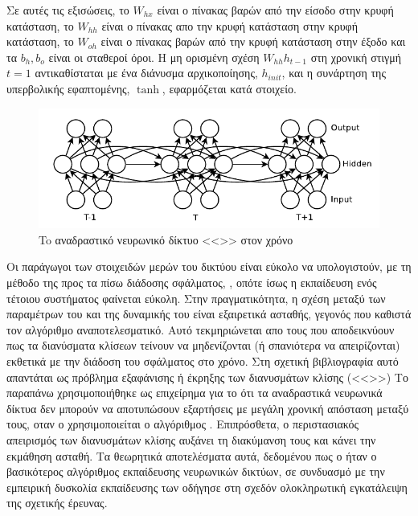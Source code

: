 Σε αυτές τις εξισώσεις, το $W_{hx}$ είναι ο πίνακας βαρών από την είσοδο στην κρυφή κατάσταση, το $W_{hh}$ είναι ο πίνακας απο την κρυφή κατάσταση στην κρυφή κατάσταση, το $W_{oh}$ είναι ο πίνακας βαρών από την κρυφή κατάσταση στην έξοδο και τα $b_h, b_o$ είναι οι σταθεροί όροι.
Η μη ορισμένη σχέση $W_{hh}h_{t-1}$ στη χρονική στιγμή $t = 1$ αντικαθίσταται με ένα διάνυσμα αρχικοποίησης, $h_{init}$, και η συνάρτηση της υπερβολικής εφαπτομένης, $\tanh$, εφαρμόζεται κατά στοιχείο.

\begin{figure}[tph]
	\includegraphics[width=\textwidth, keepaspectratio]{images/rnn.png}
	\centering 
	\caption{To αναδραστικό νευρωνικό δίκτυο <<>> στον χρόνο}
	\label{fig:rnn}
\end{figure}

Οι παράγωγοι των στοιχειδών μερών του δικτύου είναι εύκολο να υπολογιστούν, με τη μέθοδο της προς τα πίσω διάδοσης σφάλματος, \cite{Graves2013}, οπότε ίσως η εκπαίδευση ενός τέτοιου συστήματος φαίνεται εύκολη.
Στην πραγματικότητα, η σχέση μεταξύ των παραμέτρων του  και της δυναμικής του είναι εξαιρετικά ασταθής, γεγονός που καθιστά τον αλγόριθμο  αναποτελεσματικό.
Αυτό τεκμηριώνεται απο τους  \cite{Pascanu2012} που αποδεικνύουν πως τα διανύσματα κλίσεων τείνουν να μηδενίζονται (ή σπανιότερα να απειρίζονται) εκθετικά με την διάδοση του σφάλματος στο χρόνο.
Στη σχετική βιβλιογραφία αυτό απαντάται ως πρόβλημα εξαφάνισης ή έκρηξης των διανυσμάτων κλίσης (<<>>)
Το παραπάνω χρησιμοποιήθηκε ως επιχείρημα για το ότι τα αναδραστικά νευρωνικά δίκτυα δεν μπορούν να αποτυπώσουν εξαρτήσεις με μεγάλη χρονική απόσταση μεταξύ τους, οταν ο χρησιμοποιείται ο αλγόριθμος .
Επιπρόσθετα, ο περιστασιακός απειρισμός των διανυσμάτων κλίσης αυξάνει τη διακύμανση τους και κάνει την εκμάθηση ασταθή.
Τα θεωρητικά αποτελέσματα αυτά, δεδομένου πως ο  ήταν ο βασικότερος αλγόριθμος εκπαίδευσης νευρωνικών δικτύων, σε συνδυασμό με την εμπειρική δυσκολία εκπαίδευσης των  οδήγησε στη σχεδόν ολοκληρωτική εγκατάλειψη της σχετικής έρευνας.

